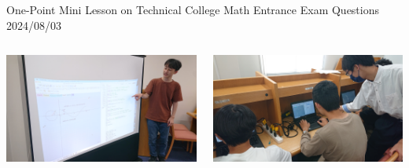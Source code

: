 \documentclass[dvipdfmx, unicode, 169]{beamer}
\begin{document}
\begin{frame}{One-Point Mini Lesson on Technical College Math Entrance Exam Questions 2024/08/03}
  \begin{columns}[T]
    \begin{column}{0.5\linewidth}
      \includegraphics[width=\linewidth]{img/ActiveReport/20240803onepoint3.jpg}
    \end{column}
    \begin{column}{0.5\linewidth}
      \includegraphics[width=\linewidth]{img/ActiveReport/20240803onepoint4.jpg}
    \end{column}
  \end{columns}
\end{frame}
\end{document}
